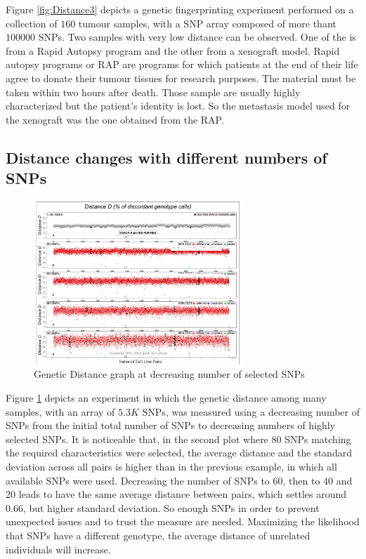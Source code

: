 		Figure \ref{fig:Distance3} depicts a genetic fingerprinting experiment performed on a collection of $160$ tumour samples, with a SNP array composed of more thant $100000$ SNPs.
		Two samples with very low distance can be observed.
		One of the is from a Rapid Autopsy program and the other from a xenograft model.
		Rapid autopsy programs or	RAP are programs for which patients at the end of their life agree to donate their tumour tissues for research purposes.
		The material must be taken within two hours after death.
		Those sample are usually highly characterized but the patient's identity is lost.
		So the metastasis model used for the xenograft was the one obtained from the RAP.

	\subsection{Distance changes with different numbers of SNPs}

	\begin{figure}[H]
		\centering
		\includegraphics[width=0.7\textwidth]{selected.PNG}
		\caption{Genetic Distance graph at decreasing number of selected SNPs}
		\label{fig:sel_snp}
	\end{figure}

	Figure \ref{fig:sel_snp} depicts an experiment in which the genetic distance among many samples, with an array of $5.3K$ SNPs, was measured using a decreasing number of SNPs from the initial total number of SNPs to decreasing numbers of highly selected SNPs.
	It is noticeable that, in the second plot where $80$ SNPs matching the required characteristics were selected, the average distance and the standard deviation across all pairs is higher than in the previous example, in which all available SNPs were used.
	Decreasing the number of SNPs to 60, then to 40 and 20 leads to have the same average distance between pairs, which settles around 0.66, but higher standard deviation.
	So enough SNPs in order to prevent unexpected issues and to trust the measure are needed.
	Maximizing the likelihood that SNPs have a different genotype, the average distance of unrelated individuals will increase.

